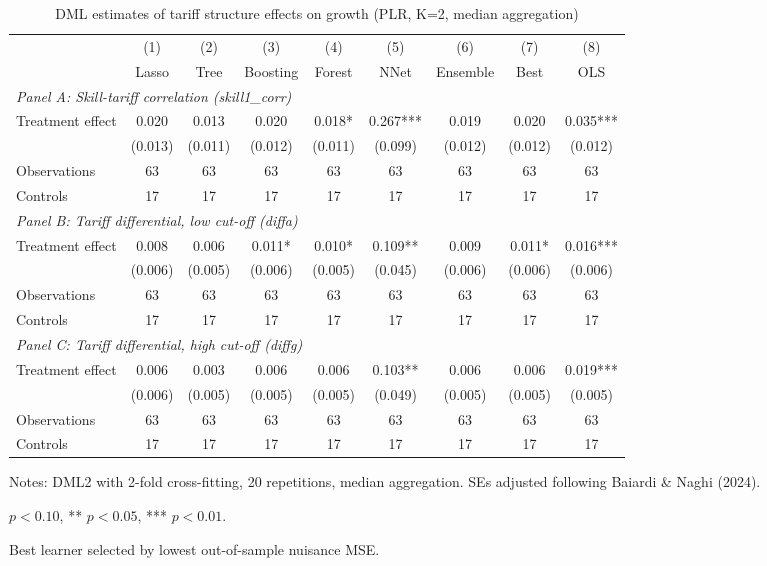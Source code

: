 \begin{table}[htbp]
\centering
\caption{DML estimates of tariff structure effects on growth (PLR, K=2, median aggregation)}
\small
\begin{tabular}{lcccccccc}
\toprule
 & (1) & (2) & (3) & (4) & (5) & (6) & (7) & (8) \\
 & Lasso & Tree & Boosting & Forest & NNet & Ensemble & Best & OLS \\
\midrule
\multicolumn{9}{l}{\textit{Panel A: Skill-tariff correlation (skill1\_corr)}} \\
Treatment effect & 0.020 & 0.013 & 0.020 & 0.018* & 0.267*** & 0.019 & 0.020 & 0.035*** \\
 & (0.013) & (0.011) & (0.012) & (0.011) & (0.099) & (0.012) & (0.012) & (0.012) \\
Observations & 63 & 63 & 63 & 63 & 63 & 63 & 63 & 63 \\
Controls & 17 & 17 & 17 & 17 & 17 & 17 & 17 & 17 \\
\midrule
\multicolumn{9}{l}{\textit{Panel B: Tariff differential, low cut-off (diffa)}} \\
Treatment effect & 0.008 & 0.006 & 0.011* & 0.010* & 0.109** & 0.009 & 0.011* & 0.016*** \\
 & (0.006) & (0.005) & (0.006) & (0.005) & (0.045) & (0.006) & (0.006) & (0.006) \\
Observations & 63 & 63 & 63 & 63 & 63 & 63 & 63 & 63 \\
Controls & 17 & 17 & 17 & 17 & 17 & 17 & 17 & 17 \\
\midrule
\multicolumn{9}{l}{\textit{Panel C: Tariff differential, high cut-off (diffg)}} \\
Treatment effect & 0.006 & 0.003 & 0.006 & 0.006 & 0.103** & 0.006 & 0.006 & 0.019*** \\
 & (0.006) & (0.005) & (0.005) & (0.005) & (0.049) & (0.005) & (0.005) & (0.005) \\
Observations & 63 & 63 & 63 & 63 & 63 & 63 & 63 & 63 \\
Controls & 17 & 17 & 17 & 17 & 17 & 17 & 17 & 17 \\
\bottomrule
\end{tabular}
\begin{tablenotes}
\small
\item Notes: DML2 with 2-fold cross-fitting, 20 repetitions, median aggregation. SEs adjusted following Baiardi \& Naghi (2024).
\item * $p<0.10$, ** $p<0.05$, *** $p<0.01$.
\item Best learner selected by lowest out-of-sample nuisance MSE.
\end{tablenotes}
\end{table}